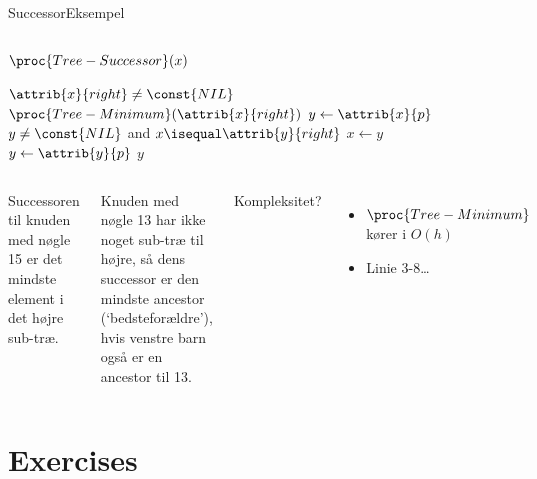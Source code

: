 \documentclass[aspectratio=1610]{beamer}
\begin{document}
\begin{frame}{Successor}{Eksempel}
\begin{columns}
        \begin{block}{$\proc{Tree-Successor}(x)$}
            \scriptsize
        
            \vspace{-\abovedisplayskip}
            \begin{codebox}
                \li \If $\attrib{x}{right} \neq \const{NIL}$
                \li \Then
                        \Return $\proc{Tree-Minimum}(\attrib{x}{right})$
                \li \Else
                \li     $y \gets \attrib{x}{p}$
                \li     \While $y \neq \const{NIL}$ and $x \isequal \attrib{y}{right}$ 
                            \Do
                \li             $x \gets y$
                \li             $y \gets \attrib{y}{p}$ 
                            \End
                    \End
                \li \Return $y$
            \end{codebox}
        \end{block}
    \end{columns}

    \begin{columns}[t]
        \small

        Successoren til knuden med nøgle 15 er det mindste element i det højre
        sub-træ.
    
        \small

        Knuden med nøgle 13 har ikke noget sub-træ til højre, så dens successor
        er den mindste ancestor (`bedsteforældre'), hvis venstre barn også er en
        ancestor til 13.

        \vfill
        \small
        Kompleksitet?

        \begin{itemize}
        \small
            \item<5-> $\proc{Tree-Minimum}$ kører i $O(h)$
            \item<6-> Linie 3-8\ldots {}
        \end{itemize}
    \end{columns}

\end{frame}


\section{Exercises}
\end{document}
